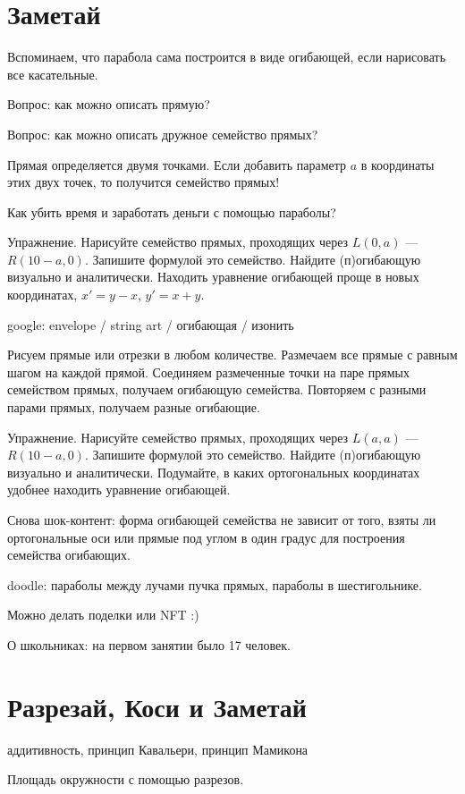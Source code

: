 \documentclass[12pt]{article}
\theoremstyle{definition}
\begin{document}
\section{Заметай}

Вспоминаем, что парабола сама построится в виде огибающей, если нарисовать все касательные. 

Вопрос: как можно описать прямую?

Вопрос: как можно описать дружное семейство прямых?

Прямая определяется двумя точками. Если добавить параметр $a$ в координаты этих двух точек, то получится семейство прямых!

Как убить время и заработать деньги с помощью параболы?

Упражнение. Нарисуйте семейство прямых, проходящих через $L(0, a)$ — $R(10 - a, 0)$. 
Запишите формулой это семейство. Найдите (п)огибающую визуально и аналитически.
Находить уравнение огибающей проще в новых координатах, $x' = y - x$, $y'=x+y$.

google: envelope / string art / огибающая / изонить

Рисуем прямые или отрезки в любом количестве. Размечаем все прямые с равным шагом на каждой прямой. 
Соединяем размеченные точки на паре прямых семейством прямых, получаем огибающую семейства. Повторяем с разными парами прямых, получаем разные огибающие.

Упражнение. Нарисуйте семейство прямых, проходящих через $L(a, a)$ — $R(10 - a, 0)$. 
Запишите формулой это семейство. Найдите (п)огибающую визуально и аналитически.
Подумайте, в каких ортогональных координатах удобнее находить уравнение огибающей. 

Снова шок-контент: форма огибающей семейства не зависит от того, 
взяты ли ортогональные оси или прямые под углом в один градус для построения семейства огибающих.

doodle: параболы между лучами пучка прямых, параболы в шестигольнике. 

Можно делать поделки или NFT :)

О школьниках: на первом занятии было 17 человек. 

\section{Разрезай, Коси и Заметай} 

аддитивность, принцип Кавальери, принцип Мамикона

Площадь окружности с помощью разрезов. 
\end{document}
